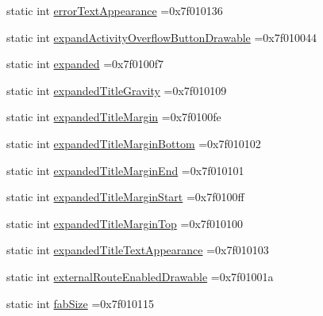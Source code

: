 \begin{DoxyCompactItemize}
\item 
static int \hyperlink{classandroid_1_1support_1_1graphics_1_1drawable_1_1animated_1_1R_1_1attr_ae897b068558d2a84b883b5ae39456c94}{error\+Text\+Appearance} =0x7f010136
\item 
static int \hyperlink{classandroid_1_1support_1_1graphics_1_1drawable_1_1animated_1_1R_1_1attr_aca2a55383d7ab287d41022d052241689}{expand\+Activity\+Overflow\+Button\+Drawable} =0x7f010044
\item 
static int \hyperlink{classandroid_1_1support_1_1graphics_1_1drawable_1_1animated_1_1R_1_1attr_a58b977313330837ff0ba4d94a60957f6}{expanded} =0x7f0100f7
\item 
static int \hyperlink{classandroid_1_1support_1_1graphics_1_1drawable_1_1animated_1_1R_1_1attr_a793864cc2e24fc0e898ea236809e9569}{expanded\+Title\+Gravity} =0x7f010109
\item 
static int \hyperlink{classandroid_1_1support_1_1graphics_1_1drawable_1_1animated_1_1R_1_1attr_a2d6b5451a1db0c68014f4fb7a47b06de}{expanded\+Title\+Margin} =0x7f0100fe
\item 
static int \hyperlink{classandroid_1_1support_1_1graphics_1_1drawable_1_1animated_1_1R_1_1attr_afa13f75cbb34f1309c1ba6d26788e363}{expanded\+Title\+Margin\+Bottom} =0x7f010102
\item 
static int \hyperlink{classandroid_1_1support_1_1graphics_1_1drawable_1_1animated_1_1R_1_1attr_a50ab70cb95fc2a5a2be027c83ceadc72}{expanded\+Title\+Margin\+End} =0x7f010101
\item 
static int \hyperlink{classandroid_1_1support_1_1graphics_1_1drawable_1_1animated_1_1R_1_1attr_a7b1777de2db6ecf22f48a9c15397db90}{expanded\+Title\+Margin\+Start} =0x7f0100ff
\item 
static int \hyperlink{classandroid_1_1support_1_1graphics_1_1drawable_1_1animated_1_1R_1_1attr_a56f2fcfdf07c2a70468afe7a93a8ab37}{expanded\+Title\+Margin\+Top} =0x7f010100
\item 
static int \hyperlink{classandroid_1_1support_1_1graphics_1_1drawable_1_1animated_1_1R_1_1attr_a3a1bca18734c1cb5fa5faa4561dd0ec1}{expanded\+Title\+Text\+Appearance} =0x7f010103
\item 
static int \hyperlink{classandroid_1_1support_1_1graphics_1_1drawable_1_1animated_1_1R_1_1attr_a87fa21d0410ecbc9cd96c6c7a2294145}{external\+Route\+Enabled\+Drawable} =0x7f01001a
\item 
static int \hyperlink{classandroid_1_1support_1_1graphics_1_1drawable_1_1animated_1_1R_1_1attr_a224b1a503db3b44afbe360b7e0615ac5}{fab\+Size} =0x7f010115

\end{DoxyCompactItemize}
